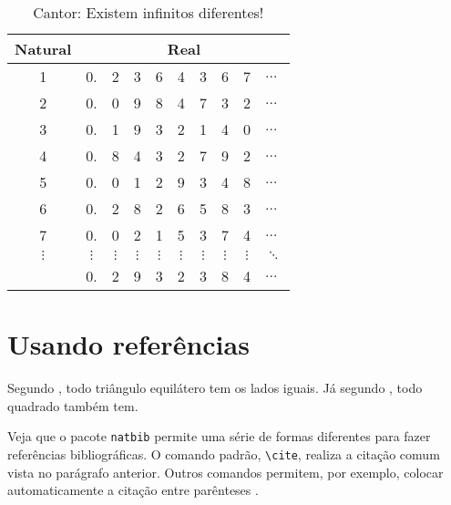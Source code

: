 \documentclass[
	msc,
	english
]{ppgccufmg}
\begin{document}
		\begin{table}[h]
			\centering
			\begin{tabular}{c|ccccccccl}
				Natural & \multicolumn{9}{c}{Real}   \\ \hline
				1 & 0.  & {\color{red} 2}  & 3   & 6   & 4   & 3   & 6   & 7   & $\ldots$ \\
				2  & 0.  & 0   & {\color{red} 9}  & 8   & 4   & 7   & 3   & 2   & $\ldots$ \\
				3  & 0.  & 1   & 9   & {\color{red} 3}  & 2   & 1   & 4   & 0   & $\ldots$ \\
				4  & 0.  & 8   & 4   & 3   & {\color{red} 2}  & 7   & 9   & 2   & $\ldots$ \\
				5  & 0.  & 0   & 1   & 2   & 9   & {\color{red} 3}  & 4   & 8   & $\ldots$ \\
				6  & 0.  & 2   & 8   & 2   & 6   & 5   & {\color{red} 8}  & 3   & $\ldots$ \\
				7  & 0.  & 0   & 2   & 1   & 5   & 3   & 7   & {\color{red} 4}  & $\ldots$ \\
				$\vdots$ & $\vdots$  & $\vdots$  & $\vdots$  & $\vdots$  & $\vdots$  & $\vdots$  & $\vdots$  & $\vdots$  & $\ddots$ \\ \hline
				\multicolumn{1}{l|}{} & \multicolumn{1}{l}{0.} & \multicolumn{1}{l}{{\color{red} 2}} & \multicolumn{1}{l}{{\color{red} 9}} & \multicolumn{1}{l}{{\color{red} 3}} & \multicolumn{1}{l}{{\color{red} 2}} & \multicolumn{1}{l}{{\color{red} 3}} & \multicolumn{1}{l}{{\color{red} 8}} & \multicolumn{1}{l}{{\color{red} 4}} & $\ldots$
			\end{tabular}
			\caption{Cantor: Existem infinitos diferentes!}
			\label{tab:exemplo}
		\end{table}

		\section{Usando referências}
			Segundo \cite{horn86robot}, todo triângulo equilátero tem os lados iguais. Já segundo \cite{shashua97photometric}, todo quadrado também tem.
			
			Veja que o pacote \verb|natbib| permite uma série de formas diferentes para fazer referências bibliográficas. O comando padrão, \verb|\cite|, realiza a citação comum vista no parágrafo anterior. Outros comandos permitem, por exemplo, colocar automaticamente a citação entre	parênteses \citep{hougen93estimation, sato99illumination2, sato99illumination1, sato01stability}.
			
\end{document}
